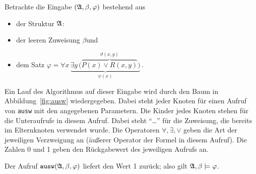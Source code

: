 \documentclass[fontsize=11pt, twoside=false, numbers=autoenddot]{scrbook}
\begin{document}
Betrachte die Eingabe $(\mathfrak{A},\beta,\varphi)$ bestehend aus
%
\begin{itemize}
  \item
    der Struktur $\mathfrak{A}$:~
    \par\medskip
  \item
    der leeren Zuweisung $\beta$\quad und
    \par\smallskip
  \item
    dem Satz
    $
      \varphi = \forall x\,
      \underbrace{
        \exists y\,\Big(
        \overbrace{
          P(x) \lor R(x,y)
        }^{
          \vartheta(x,y)
        }
        \Big)
      }_{
        \psi(x)
      }
    $\,.
\end{itemize}
%
Ein Lauf des Algorithmus auf dieser Eingabe wird durch den Baum in Abbildung~\ref{fig:ausw} wiedergegeben.
Dabei steht jeder Knoten für einen Aufruf von \texttt{ausw} mit den angegebenen Parametern.
Die Kinder jedes Knoten stehen für die Unteraufrufe in diesem Aufruf.
Dabei steht "`\dots"' für die Zuweisung, die bereits im Elternknoten verwendet wurde.
Die Operatoren $\forall,\exists,\lor$ geben die Art der jeweiligen Verzweigung an (äußerer Operator der Formel in diesem Aufruf).
Die Zahlen 0 und 1 geben den Rückgabewert des jeweiligen Aufrufs an.

Der Aufruf $\texttt{ausw}(\mathfrak{A},\beta,\varphi)$ liefert den Wert 1 zurück;
also gilt $\mathfrak{A},\beta \models \varphi$.
\end{document}
